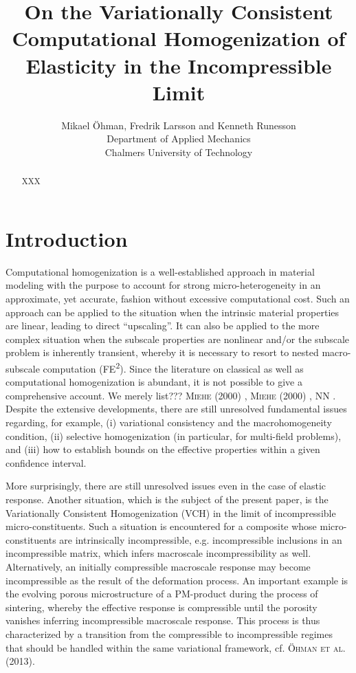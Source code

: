 \documentclass[12pt,a4paper]{article}
\title{On the Variationally Consistent Computational Homogenization of Elasticity in the Incompressible Limit}
\author{
Mikael Öhman, Fredrik Larsson and Kenneth Runesson\\
Department of Applied Mechanics \\
Chalmers University of Technology}
\begin{document}
\maketitle
\begin{abstract}
\noindent XXX
\end{abstract}

\section{Introduction}

Computational homogenization is a well-established approach in material modeling with the purpose to account for strong micro-heterogeneity in an approximate, yet accurate, fashion without excessive computational cost.
Such an approach can be applied to the situation when the intrinsic material properties are linear, leading to direct ``upscaling''.
It can also be applied to the more complex situation when the subscale properties are nonlinear and/or the subscale problem is inherently transient, whereby it is necessary to resort to nested macro-subscale computation (FE\textsuperscript{2}).
Since the literature on classical as well as computational homogenization is abundant, it is not possible to give a comprehensive account.
We merely list??? \textsc{Miehe (2000)} \cite{Miehe2000}, \textsc{Miehe (2000)} \cite{Miehe2000}, NN \cite{NN2000}.
Despite the extensive developments, there are still unresolved fundamental issues regarding, for example, (i) variational consistency and the macrohomogeneity condition, (ii) selective homogenization (in particular, for multi-field problems), and (iii) how to establish bounds on the effective properties within a given confidence interval.

More surprisingly, there are still unresolved issues even in the case of elastic response.
Another situation, which is the subject of the present paper, is the Variationally Consistent Homogenization (VCH) in the limit of incompressible micro-constituents.
Such a situation is encountered for a composite whose micro-constituents are intrinsically incompressible, e.g. incompressible inclusions in an incompressible matrix, which infers macroscale incompressibility as well.
Alternatively, an initially compressible macroscale response may become incompressible as the result of the deformation process.
An important example is the evolving porous microstructure of a PM-product during the process of sintering, whereby the effective response is compressible until the porosity vanishes inferring incompressible macroscale response.
This process is thus characterized by a transition from the compressible to incompressible regimes that should be handled within the same variational framework, cf. \textsc{Öhman et al. (2013)}.
\end{document}
